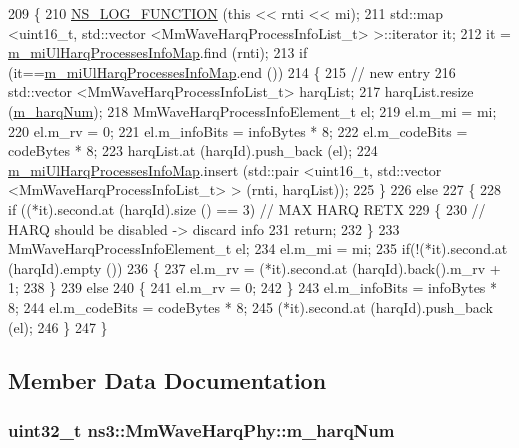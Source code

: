\begin{DoxyCode}
209 \{
210   \hyperlink{log-macros-disabled_8h_a90b90d5bad1f39cb1b64923ea94c0761}{NS\_LOG\_FUNCTION} (\textcolor{keyword}{this} << rnti << mi);
211   std::map <uint16\_t, std::vector <MmWaveHarqProcessInfoList\_t> >::iterator it;
212   it = \hyperlink{classns3_1_1MmWaveHarqPhy_ab8f5ff765751b8ba84f4d0f4f7c1edc7}{m\_miUlHarqProcessesInfoMap}.find (rnti);
213   \textcolor{keywordflow}{if} (it==\hyperlink{classns3_1_1MmWaveHarqPhy_ab8f5ff765751b8ba84f4d0f4f7c1edc7}{m\_miUlHarqProcessesInfoMap}.end ())
214     \{
215       \textcolor{comment}{// new entry}
216       std::vector <MmWaveHarqProcessInfoList\_t> harqList;
217       harqList.resize (\hyperlink{classns3_1_1MmWaveHarqPhy_a3f052a77084afbac3ae04ca1de543a71}{m\_harqNum});
218       MmWaveHarqProcessInfoElement\_t el;
219       el.m\_mi = mi;
220       el.m\_rv = 0;
221       el.m\_infoBits = infoBytes * 8;
222       el.m\_codeBits = codeBytes * 8;
223       harqList.at (harqId).push\_back (el);
224       \hyperlink{classns3_1_1MmWaveHarqPhy_ab8f5ff765751b8ba84f4d0f4f7c1edc7}{m\_miUlHarqProcessesInfoMap}.insert (std::pair <uint16\_t, std::vector
       <MmWaveHarqProcessInfoList\_t> > (rnti, harqList));
225     \}
226   \textcolor{keywordflow}{else}
227     \{
228       \textcolor{keywordflow}{if} ((*it).second.at (harqId).size () == 3) \textcolor{comment}{// MAX HARQ RETX}
229         \{
230           \textcolor{comment}{// HARQ should be disabled -> discard info}
231           \textcolor{keywordflow}{return};
232         \}
233       MmWaveHarqProcessInfoElement\_t el;
234       el.m\_mi = mi;
235       \textcolor{keywordflow}{if}(!(*it).second.at (harqId).empty ())
236       \{
237         el.m\_rv = (*it).second.at (harqId).back().m\_rv + 1;
238       \}
239       \textcolor{keywordflow}{else}
240       \{
241         el.m\_rv = 0;
242       \}
243       el.m\_infoBits = infoBytes * 8;
244       el.m\_codeBits = codeBytes * 8;
245       (*it).second.at (harqId).push\_back (el);
246     \}
247 \}
\end{DoxyCode}


\subsection{Member Data Documentation}
\subsubsection[{\texorpdfstring{m\+\_\+harq\+Num}{m_harqNum}}]{\setlength{\rightskip}{0pt plus 5cm}uint32\+\_\+t ns3\+::\+Mm\+Wave\+Harq\+Phy\+::m\+\_\+harq\+Num\hspace{0.3cm}{\ttfamily [private]}}\hypertarget{classns3_1_1MmWaveHarqPhy_a3f052a77084afbac3ae04ca1de543a71}{}\label{classns3_1_1MmWaveHarqPhy_a3f052a77084afbac3ae04ca1de543a71}
